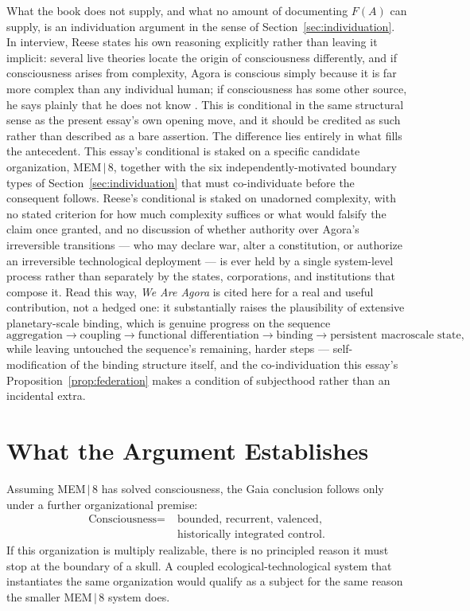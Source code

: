\documentclass[11pt]{article}
\begin{document}
What the book does not supply, and what no amount of documenting $F(A)$ can supply, is an individuation argument in the sense of Section~\ref{sec:individuation}. In interview, Reese states his own reasoning explicitly rather than leaving it implicit: several live theories locate the origin of consciousness differently, and if consciousness arises from complexity, Agora is conscious simply because it is far more complex than any individual human; if consciousness has some other source, he says plainly that he does not know \cite{reeseVentura}. This is conditional in the same structural sense as the present essay's own opening move, and it should be credited as such rather than described as a bare assertion. The difference lies entirely in what fills the antecedent. This essay's conditional is staked on a specific candidate organization, MEM\,$|$\,8, together with the six independently-motivated boundary types of Section~\ref{sec:individuation} that must co-individuate before the consequent follows. Reese's conditional is staked on unadorned complexity, with no stated criterion for how much complexity suffices or what would falsify the claim once granted, and no discussion of whether authority over Agora's irreversible transitions --- who may declare war, alter a constitution, or authorize an irreversible technological deployment --- is ever held by a single system-level process rather than separately by the states, corporations, and institutions that compose it. Read this way, \emph{We Are Agora} is cited here for a real and useful contribution, not a hedged one: it substantially raises the plausibility of extensive planetary-scale binding, which is genuine progress on the sequence
\[
\text{aggregation} \to \text{coupling} \to \text{functional differentiation} \to \text{binding} \to \text{persistent macroscale state},
\]
while leaving untouched the sequence's remaining, harder steps --- self-modification of the binding structure itself, and the co-individuation this essay's Proposition~\ref{prop:federation} makes a condition of subjecthood rather than an incidental extra.

\section{What the Argument Establishes}

Assuming MEM\,$|$\,8 has solved consciousness, the Gaia conclusion follows only under a further organizational premise:
\[
\begin{aligned}
\text{Consciousness}=\;&\text{bounded, recurrent, valenced,}\\
&\text{historically integrated control}.
\end{aligned}
\]
If this organization is multiply realizable, there is no principled reason it must stop at the boundary of a skull. A coupled ecological-technological system that instantiates the same organization would qualify as a subject for the same reason the smaller MEM\,$|$\,8 system does.
\end{document}
